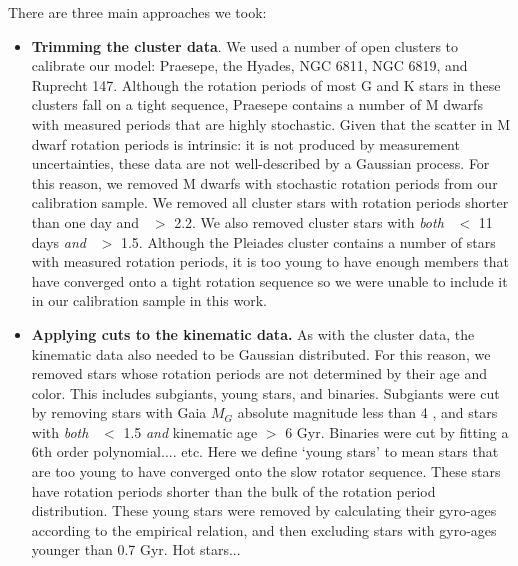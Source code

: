 There are three main approaches we took:
\begin{itemize}
\item {\bf Trimming the cluster data}.
We used a number of open clusters to calibrate our model: Praesepe, the
Hyades, NGC 6811, NGC 6819, and Ruprecht 147.
Although the rotation periods of most G and K stars in these clusters fall on
a tight sequence, Praesepe contains a number of M dwarfs with measured periods
that are highly stochastic.
Given that the scatter in M dwarf rotation periods is intrinsic: it is not
produced by measurement uncertainties, these data are not well-described by a
Gaussian process.
For this reason, we removed M dwarfs with stochastic rotation periods from our
calibration sample.
We removed all cluster stars with rotation periods shorter than one day and
\gcolor\ $>$ 2.2.
We also removed cluster stars with {\it both} \prot\ $<$ 11 days {\it and}
\gcolor\ $>$ 1.5.
Although the Pleiades cluster contains a number of stars with measured
rotation periods, it is too young to have enough members that have converged
onto a tight rotation sequence so we were unable to include it in our
calibration sample in this work.

\item {\bf Applying cuts to the kinematic data.}
As with the cluster data, the kinematic data also needed to be Gaussian
distributed.
For this reason, we removed stars whose rotation periods are not
determined by their age and color.
This includes subgiants, young stars, and binaries.
Subgiants were cut by removing stars with Gaia $M_G$ absolute magnitude less
than 4 , and stars with {\it both} \gcolor\ $<$ 1.5 {\it
and} kinematic age $>$ 6 Gyr.
Binaries were cut by fitting a 6th order polynomial.... etc.
Here we define `young stars' to mean stars that are too young to have
converged onto the slow rotator sequence.
These stars have rotation periods shorter than the bulk of the rotation period
distribution.
These young stars were removed by calculating their gyro-ages according to the
\citet{angus2019} empirical relation, and then excluding stars with gyro-ages
younger than 0.7 Gyr.
Hot stars...


\end{itemize}

